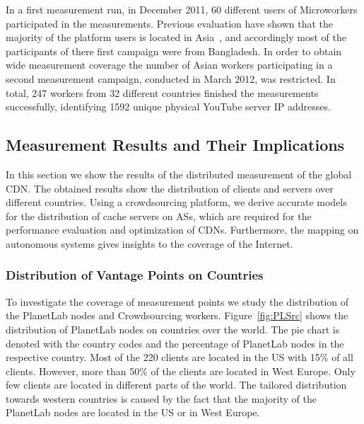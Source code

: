 In a first measurement run, in December 2011, 60 different users of Microworkers participated in the measurements.
Previous evaluation have shown that the majority of the platform users is located in Asia~\cite{conf2011-410}, and accordingly most of the participants of there first campaign were from Bangladesh.
In order to obtain wide measurement coverage the number of Asian workers participating in a second measurement campaign, conducted in March 2012, was restricted.
In total, 247 workers from 32 different countries finished the measurements successfully, identifying 1592 unique physical YouTube server IP addresses.

\subsection{Measurement Results and Their Implications}
\label{sec:crowd:results}

In this section we show the results of the distributed measurement of the global CDN.
The obtained results show the distribution of clients and servers over different countries.
Using a crowdsourcing platform, we derive accurate models for the distribution of cache servers on ASs, which are required for the performance evaluation and optimization of CDNs.
Furthermore, the mapping on autonomous systems gives insights to the coverage of the Internet.

\subsubsection{Distribution of Vantage Points on Countries}

To investigate the coverage of measurement points we study the distribution of the PlanetLab nodes and Crowdsourcing workers.
Figure~\ref{fig:PLSrc} shows the distribution of PlanetLab nodes on countries over the world.
The pie chart is denoted with the country codes and the percentage of PlanetLab nodes in the respective country.
Most of the 220 clients are located in the US with 15\% of all clients.
However, more than 50\% of the clients are located in West Europe.
Only few clients are located in different parts of the world.
The tailored distribution towards western countries is caused by the fact that the majority of the PlanetLab nodes are located in the US or in West Europe.

